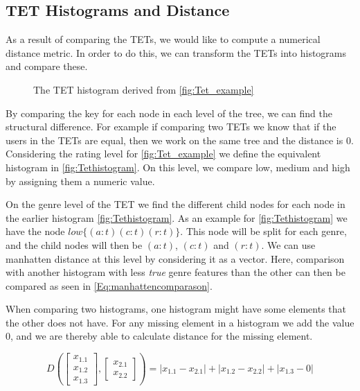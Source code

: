 \subsection{TET Histograms and Distance}\label{Subsec:TET_historgram_and_distance}
	As a result of comparing the TETs, we would like to compute a numerical distance metric. In order to do this, we can transform the TETs into histograms and compare these\cite{JAEGER201330}.
	\begin{figure}[H]
		\centering
		\begin{adjustbox}{width=0.5\textwidth}
			
		\end{adjustbox}
		\caption{The TET histogram derived from \autoref{fig:Tet_example}}
		\label{fig:Tethistogram}
	\end{figure}

	By comparing the key for each node in each level of the tree, we can find the structural difference. For example if comparing two TETs we know that if the users in the TETs are equal, then we work on the same tree and the distance is $0$. Considering the rating level for \autoref{fig:Tet_example} we define the equivalent histogram in \autoref{fig:Tethistogram}. On this level, we compare low, medium and high by assigning them a numeric value.

	On the genre level of the TET we find the different child nodes for each node in the earlier histogram \autoref{fig:Tethistogram}. As an example for  \autoref{fig:Tethistogram} we have the node  $low\{(a:t)(c:t)(r:t)\}$. This node will be split for each genre,  and the child nodes will then be  $(a:t)$, $(c:t)$ and $(r:t)$. We can use manhatten distance at this level by considering it as a vector. Here, comparison with another histogram with less \textit{true} genre features than the other can then be compared as seen in \autoref{Eq:manhattencomparason}\cite{singh2013k}.

	When comparing two histograms, one histogram might have some elements that the other does not have. For any missing element in a histogram we add the value $0$, and we are thereby able to calculate distance for the missing element.

	\begin{equation}\label{Eq:manhattencomparason}
	D(\begin{bmatrix}
	x_{1.1} \\
	x_{1.2} \\
	x_{1.3}
	\end{bmatrix},
	\begin{bmatrix}
	x_{2.1} \\
	x_{2.2}
	\end{bmatrix})= |x_{1.1} - x_{2.1}| + |x_{1.2} - x_{2.2}| + |x_{1.3} - 0|
	\end{equation}

